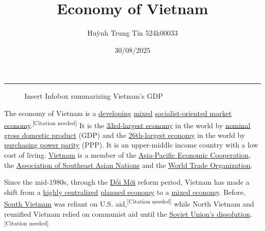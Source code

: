 \documentclass{article}
\title{Economy of Vietnam}
\author{Huỳnh Trung Tín 524k00033}
\date{30/08/2025}
\begin{document}



\maketitle
\par\noindent\rule[-5pt]{\textwidth}{0.1pt}

\begin{figure}
    \begin{framed}
    Insert Infobox summarizing Vietnam's GDP
    \end{framed}
\end{figure}

The economy of Vietnam is a \href{https://en.wikipedia.org/wiki/Developing_economy}{developing} \href{https://en.wikipedia.org/wiki/Mixed_economy}{mixed} \href{https://en.wikipedia.org/wiki/Socialist-oriented_market_economy}{socialist-oriented market economy}.\textsuperscript{[Citation needed]} It is the \href{https://en.wikipedia.org/wiki/List_of_countries_by_GDP_(nominal)}{33rd-largest economy} in the world by \href{https://en.wikipedia.org/wiki/Nominal_gross_domestic_product}{nominal gross domestic product} (GDP) and the \href{https://en.wikipedia.org/wiki/List_of_countries_by_GDP_(PPP)}{26th-largest economy} in the world by \href{https://en.wikipedia.org/wiki/Purchasing_power_parity}{purchasing power parity} (PPP). It is an upper-middle income country with a low cost of living. \href{https://en.wikipedia.org/wiki/Vietnam}{Vietnam} is a member of the \href{https://en.wikipedia.org/wiki/Asia-Pacific_Economic_Cooperation}{Asia-Pacific Economic Cooperation}, the \href{https://en.wikipedia.org/wiki/Association_of_Southeast_Asian_Nations}{Association of Southeast Asian Nations} and the \href{https://en.wikipedia.org/wiki/World_Trade_Organization}{World Trade Organization}.

Since the mid-1980s, through the \href{https://en.wikipedia.org/wiki/%C4%90%E1%BB%95i_M%E1%BB%9Bi}{Đổi Mới} reform period, Vietnam has made a shift from a \href{https://en.wikipedia.org/wiki/Centralization}{highly centralized} \href{https://en.wikipedia.org/wiki/Planned_economy}{planned economy} to a \href{https://en.wikipedia.org/wiki/Mixed_economy}{mixed economy}. Before, \href{https://en.wikipedia.org/wiki/North_Vietnam}{South Vietnam} was reliant on U.S. aid,\textsuperscript{[Citation needed]} while North Vietnam and reunified Vietnam relied on communist aid until the \href{https://en.wikipedia.org/wiki/Dissolution_of_the_Soviet_Union}{Soviet Union's dissolution}.\textsuperscript{[Citation needed]}
\end{document}
